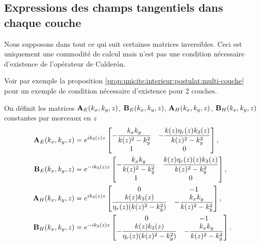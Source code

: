     \subsection{Expressions des champs tangentiels dans chaque couche}

      \begin{remark}
        Nous supposons dans tout ce qui suit certaines matrices inversibles.
        Ceci est uniquement une commodité de calcul mais n'est pas une condition nécessaire d'existence de l'opérateur de Calderón. 

        Voir par exemple la proposition \ref{prop:unicite:interieur:postulat:multi-couche} pour un exemple de condition nécessaire d’existence pour 2 couches.
      \end{remark}

      \begin{defn}
        On définit les matrices \(\mathbf{A}_{E}(k_x,k_y,z)\), \(\mathbf{B}_{E}(k_x,k_y,z)\), \(\mathbf{A}_{H}(k_x,k_y,z)\), \(\mathbf{B}_{H}(k_x,k_y,z)\) constantes par morceaux en \(z\)
        \begin{align*}
          \mathbf{A}_{E}(k_x,k_y,z) &= e^{ik_3(z)z}
          \begin{bmatrix}
            -\dfrac{k_xk_y}{k(z)^2 - k_y^2} & -\dfrac{k(z)\eta_r(z)k_3(z)}{k(z)^2 - k_y^2}
            \\
            1 & 0
          \end{bmatrix},
          \\
          \mathbf{B}_{E}(k_x,k_y,z) &= e^{-ik_3(z)z}
          \begin{bmatrix}
            -\dfrac{k_xk_y}{k(z)^2 - k_y^2} & \dfrac{k(z)\eta_r(z)(z) k_3(z)}{k(z)^2 - k_y^2}
            \\
            1 & 0
          \end{bmatrix},
          \\
          \mathbf{A}_{H}(k_x,k_y,z) &= e^{ik_3(z)z}
          \begin{bmatrix}
            0 & -1
            \\
            \dfrac{k(z)k_3(z)}{\eta_r(z)(k(z)^2 - k_y^2)} & -\dfrac{k_xk_y}{k(z)^2 - k_y^2}
          \end{bmatrix},
          \\
          \mathbf{B}_{H}(k_x,k_y,z) &= e^{-ik_3(z)z}
          \begin{bmatrix}
            0 & -1
            \\
            -\dfrac{k(z)k_3(z)}{\eta_r(z)(k(z)^2 - k_y^2)} & -\dfrac{k_xk_y}{k(z)^2 - k_y^2}
          \end{bmatrix}.
        \end{align*}
      \end{defn}
